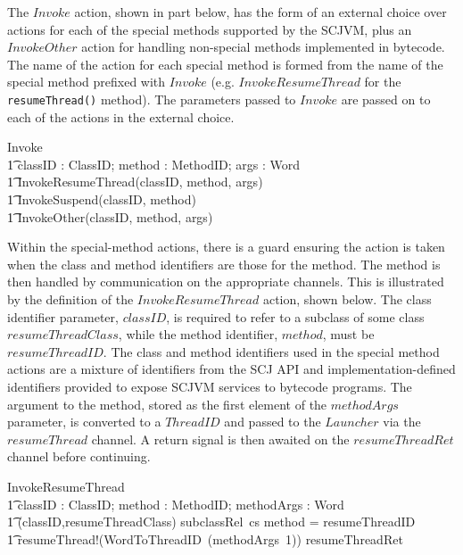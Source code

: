 The $Invoke$ action, shown in part below, has the form of an external
choice over actions for each of the special methods supported by the
SCJVM, plus an $InvokeOther$ action for handling non-special methods
implemented in bytecode.
The name of the action for each special method is formed from the name
of the special method prefixed with $Invoke$ (e.g. 
$InvokeResumeThread$ for the \texttt{resumeThread()} method).
The parameters passed to $Invoke$ are passed on to
each of the actions in the external choice.
\begin{circusaction}
  Invoke \circdef \\
  \t1 \circval classID : ClassID; \circval method : MethodID; \circval args : \seq Word \circspot \\
  \t1 InvokeResumeThread(classID, method, args) \\
  \t1 {} \extchoice InvokeSuspend(classID, method) \extchoice \cdots \\
  \t1 {} \extchoice InvokeOther(classID, method, args)
\end{circusaction}

Within the special-method actions, there is a guard ensuring the
action is taken when the class and method identifiers are those for
the method.
The method is then handled by communication on the appropriate
channels.
This is illustrated by the definition of the $InvokeResumeThread$
action, shown below.
The class identifier parameter, $classID$, is required to refer to a
subclass of some class $resumeThreadClass$, while the method
identifier, $method$, must be $resumeThreadID$.
The class and method identifiers used in the special method actions
are a mixture of identifiers from the SCJ API and
implementation-defined identifiers provided to expose SCJVM services
to bytecode programs.
The argument to the method, stored as the first element of the
$methodArgs$ parameter, is converted to a $ThreadID$ and passed to the
$Launcher$ via the $resumeThread$ channel.
A return signal is then awaited on the $resumeThreadRet$ channel
before continuing.
\begin{circusaction}
  InvokeResumeThread \circdef \\
  \t1 \circval classID : ClassID; \circval method : MethodID; \circval methodArgs : \seq Word \circspot \\
  \t1 \lcircguard (classID,resumeThreadClass) \in subclassRel~cs \land method = resumeThreadID \rcircguard \circguard {} \\
  \t1 resumeThread!(WordToThreadID~(methodArgs~1)) \then resumeThreadRet \then \Skip
\end{circusaction}

